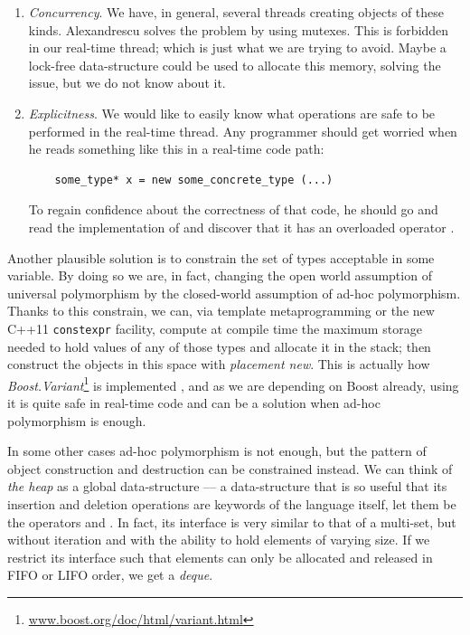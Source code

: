 \begin{enumerate}
\item \emph{Concurrency}. We have, in general, several threads
  creating objects of these kinds. Alexandrescu solves the problem by
  using mutexes. This is forbidden in our real-time thread; which is
  just what we are trying to avoid. Maybe a lock-free data-structure
  could be used to allocate this memory, solving the issue, but we do
  not know about it.

\item \emph{Explicitness}. We would like to easily know what
  operations are safe to be performed in the real-time thread. Any
  programmer should get worried when he reads something like this in a
  real-time code path:
  \begin{lstlisting}
    some_type* x = new some_concrete_type (...)
  \end{lstlisting}
  To regain confidence about the correctness
  of that code, he should go and read the implementation of
   and discover that it has an
  overloaded operator .
\end{enumerate}

Another plausible solution is to constrain the set of types acceptable
in some variable. By doing so we are, in fact, changing the open world
assumption of universal polymorphism by the closed-world assumption of
ad-hoc polymorphism. Thanks to this constrain, we can, via template
metaprogramming or the new C++11 \texttt{constexpr} facility, compute
at compile time the maximum storage needed to hold values of any of
those types and allocate it in the stack; then construct the objects
in this space with \emph{placement new}. This is actually how
\emph{Boost.Variant}\footnote{\url{www.boost.org/doc/html/variant.html}}
is implemented \cite{alexandrescu01unions}, and as we are depending on
Boost already, using it is quite safe in real-time code and can be a
solution when ad-hoc polymorphism is enough.

In some other cases ad-hoc polymorphism is not enough, but the pattern
of object construction and destruction can be constrained instead. We
can think of \emph{the heap} as a global data-structure --- a
data-structure that is so useful that its insertion and deletion
operations are keywords of the language itself, let them be the
operators  and . In fact, its interface is very
similar to that of a multi-set, but without iteration and with the
ability to hold elements of varying size. If we restrict its interface
such that elements can only be allocated and released in FIFO or
LIFO order, we get a \emph{deque}. 

